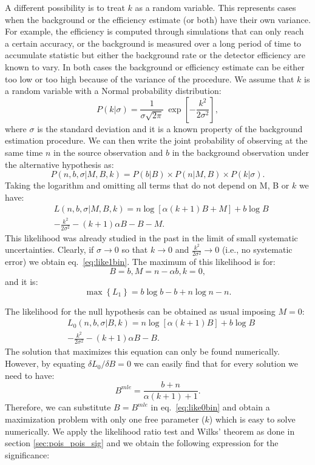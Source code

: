 \documentclass[twocolumn]{aastex61}
\begin{document}
A different possibility is to treat $k$ as a random variable. This represents cases when the background or the efficiency estimate (or both) have their own variance. For example, the efficiency is computed through simulations that can only reach a certain accuracy, or the background is measured over a long period of time to accumulate statistic but either the background rate or the detector efficiency are known to vary. In both cases the background or efficiency estimate can be either too low or too high because of the variance of the procedure. We assume that $k$ is a random variable with a Normal probability distribution:
$$
P(k | \sigma) = \frac{1}{\sigma
\sqrt{2\pi}}~\exp{\left[-\frac{k^{2}}{2\sigma^2}\right]},
\label{eq:k_pdf}
$$
where $\sigma$ is the standard deviation and it is a known property of the background estimation procedure. We can then write the joint probability of observing at the same time $n$ in the source observation and $b$ in the 
background observation under the alternative hypothesis as:
\begin{equation}
P( n, b, \sigma | M, B, k) = P(b | B) \times P(n | M, B) \times P(k | \sigma).
\end{equation}
Taking the logarithm and omitting all terms that do not depend on M, B or $k$ we have:
\begin{align}
& L(n, b, \sigma | M, B, k) = n \log{\left[\alpha (k+1) B + M \right]} + b \log{B}\nonumber \\
& - \frac{k^2}{2 \sigma^2} - (k+1)\alpha B - B - M.
\label{eq:like1binsys}
\end{align}
This likelihood was already studied in the past \citep[and references therein]{Spengler2015} in the limit of small systematic uncertainties. Clearly, if $\sigma \rightarrow 0$ so that $k \rightarrow 0$ and $\frac{k^2}{2 \sigma^2} \rightarrow 0$ (i.e., no systematic error) we obtain eq.~\ref{eq:like1bin}.
The maximum of this likelihood is for:
$$
B = b, M = n - \alpha b, k = 0,
$$
and it is:
$$
\max{\left\{L_1\right\}} = b \log{b} - b + n \log{n} - n.
$$

The likelihood for the null hypothesis can be obtained as usual imposing $M=0$:
\begin{align}
& L_0(n, b, \sigma | B, k) = n \log{\left[\alpha (k+1) B \right]} + b \log{B}\nonumber \\
& - \frac{k^2}{2 \sigma^2} - (k+1)\alpha B - B.\nonumber
\end{align}
The solution that maximizes this equation can only be found numerically. However, by equating $\delta L_{0} / \delta B = 0$ we can easily find that for every solution we need to have:
$$
B^{mle} = \frac{b + n}{\alpha (k+1) + 1}.
$$
Therefore, we can substitute $B=B^{mle}$ in eq.~\ref{eq:like0bin} and obtain a maximization problem with only one free parameter ($k$) which is easy to solve numerically. We apply the likelihood ratio test and Wilks' theorem as done in section \ref{sec:pois_pois_sig} and we obtain the following expression for the significance:
\end{document}
